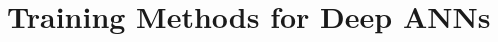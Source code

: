 \documentclass[main]{subfiles}
\begin{document}
\newpage
\section{Training Methods for Deep ANNs}
\end{document}
